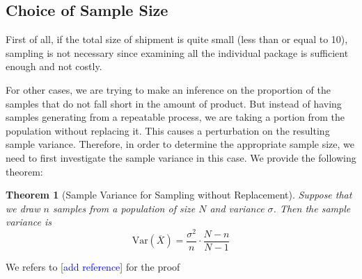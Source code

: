 \documentclass{article}
\newtheorem{theorem}{Theorem}[section]
\def\Var{\mathrm{Var}}
\def\unf#1{\textcolor{blue}{#1}}
\begin{document}
\subsection{Choice of Sample Size}

First of all, if the total size of shipment is quite small (less than or equal to 10), sampling is not necessary since examining all the individual package is sufficient enough and not costly. 

For other cases, we are trying to make an inference on the proportion of the samples that do not fall short in the amount of product. But instead of having samples generating from a repeatable process, we are taking a portion from the population without replacing it. This causes a perturbation on the resulting sample variance. Therefore, in order to determine the appropriate sample size, we need to first investigate the sample variance in this case. We provide the following theorem:

\begin{theorem}[Sample Variance for Sampling without Replacement]
    Suppose that we draw $n$ samples from a population of size $N$ and variance $\sigma$. Then the sample variance is
    $$
    \Var(\overline{X}) = \dfrac{\sigma^2}{n}\cdot\dfrac{N-n}{N-1}
    $$
\end{theorem}

We refers to [\unf{add reference}] for the proof
\end{document}
